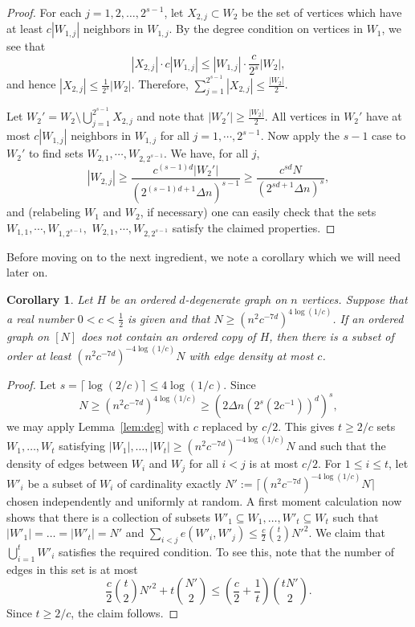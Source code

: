 \documentclass[11pt]{article}
\newtheorem{corollary}[theorem]{Corollary}
\begin{document}
\begin{proof}
For each $j=1,2,\ldots,2^{s-1}$, let $X_{2,j}\subset W_{2}$ be the set of vertices which have at least
$c |W_{1,j}|$ neighbors in $W_{1,j}$. By the degree
condition on vertices in $W_{1}$, we see that
\[
|X_{2,j}|\cdot c |W_{1,j}|\le|W_{1,j}|\cdot\frac{c}{2^s}|W_{2}|,
\]
and hence $|X_{2,j}|\le\frac{1}{2^s}|W_{2}|$. Therefore, $\sum_{j=1}^{2^{s-1}}|X_{2,j}|\le\frac{|W_{2}|}{2}$.

Let $W_{2}'=W_{2}\setminus\bigcup_{j=1}^{2^{s-1}}X_{2,j}$ and note
that $|W_{2}'|\ge\frac{|W_{2}|}{2}$. All vertices in $W_{2}'$ have
at most $c |W_{1,j}|$ neighbors in $W_{1,j}$ for all
$j=1,\cdots,2^{s-1}$. Now apply the $s-1$ case to $W_{2}'$ to find
sets $W_{2,1},\cdots,W_{2,2^{s-1}}$. We have, for all $j$, 
\[
|W_{2,j}|\ge\frac{c^{(s-1)d} |W_{2}'|}{(2^{(s-1)d + 1} \Delta n)^{s-1}}\ge\frac{c^{sd} N}{(2^{sd + 1} \Delta n)^{s}},
\]
and (relabeling $W_1$ and $W_2$, if necessary) one can easily check that the sets $W_{1,1}, \cdots, W_{1,2^{s-1}},$ $W_{2,1}, \cdots, W_{2,2^{s-1}}$
satisfy the claimed properties.
\end{proof}

Before moving on to the next ingredient, we note a corollary which we will need later on. 

\begin{corollary} \label{cor:dense}
Let $H$ be an ordered $d$-degenerate graph on $n$ vertices. Suppose that a real number $0 < c < \frac{1}{2}$ is given and that $N \geq (n^2 c^{-7d})^{4 \log(1/c)}$. If an ordered graph on $[N]$ does not contain an ordered copy of $H$, then there is a subset of order at least $(n^2 c^{-7d})^{-4 \log(1/c)}N$ with edge density at most $c$.
\end{corollary}

\begin{proof}
Let $s = \lceil \log(2/c) \rceil \leq 4 \log(1/c)$.
Since 
\[
	N \geq (n^2 c^{-7d})^{4 \log (1/c)} \geq (2\Delta n(2^s (2c^{-1}))^d)^s,
\]
we may apply Lemma~\ref{lem:deg} with $c$ replaced by $c/2$. This gives $t \geq 2/c$ sets $W_1, \dots, W_t$ satisfying $|W_1|, \dots, |W_t| \geq (n^2 c^{-7d})^{-4 \log(1/c)} N$ and such that the density of edges between $W_i$ and $W_j$ for all $i < j$ is at most $c/2$. For $1 \le i \le t$, let $W'_i$ be a subset of $W_i$ of cardinality exactly $N' := \lceil (n^2 c^{-7d})^{-4 \log(1/c)} N \rceil$ chosen
independently and uniformly at random. A first moment calculation now shows that there is a collection of subsets $W'_1 \subseteq W_1, \dots, W'_t \subseteq W_t$ such that $|W'_1| = \dots = |W'_t| = N'$ and $\sum_{i < j} e(W'_i, W'_j) \leq \frac{c}{2} \binom{t}{2} N'^2$. We claim that $\bigcup_{i=1}^t W'_i$ satisfies the required condition. To see this, note that the number of edges in this set is at most
\[\frac{c}{2} \binom{t}{2} N'^2 + t \binom{N'}{2} \leq \left(\frac{c}{2} + \frac{1}{t}\right) \binom{t N'}{2}.\]
Since $t \geq 2/c$, the claim follows.
\end{proof}
\end{document}
